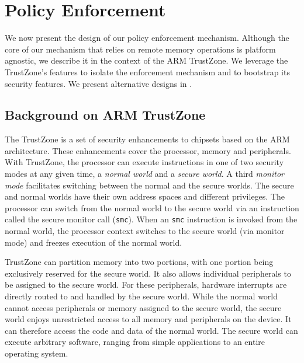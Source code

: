 \section{Policy Enforcement}
\label{section:mechanism}

We now present the design of our policy enforcement mechanism. Although the
core of our mechanism that relies on remote memory operations is platform
agnostic, we describe it in the context of the ARM TrustZone. We leverage the
TrustZone's features to isolate the enforcement mechanism and to bootstrap its
security features. We present alternative designs in
.

\subsection{Background on ARM TrustZone}
\label{section:mechanism:armback}

The TrustZone is a set of security enhancements to chipsets based on the ARM
architecture. These enhancements cover the processor, memory and peripherals.
With TrustZone, the processor can execute instructions in one of two security
modes at any given time, a \textit{normal world} and a \textit{secure world}. A
third \textit{monitor mode} facilitates switching between the normal and the
secure worlds.  The secure and normal worlds have their own address spaces and
different privileges.  The processor can switch from the normal world to the
secure world via an instruction called the secure monitor call (\texttt{smc}).
When an \texttt{smc} instruction is invoked from the normal world, the
processor context switches to the secure world (via monitor mode) and freezes
execution of the normal world.

TrustZone can partition memory into two portions, with one portion being
exclusively reserved for the secure world. It also allows individual
peripherals to be assigned to the secure world.  For these peripherals,
hardware interrupts are directly routed to and handled by the secure world.
While the normal world cannot access peripherals or memory assigned to the
secure world, the secure world enjoys unrestricted access to all memory and
peripherals on the device. It can therefore access the code and data 
of the normal world. The secure world can execute arbitrary software,
ranging from simple applications to an entire operating system.
%

